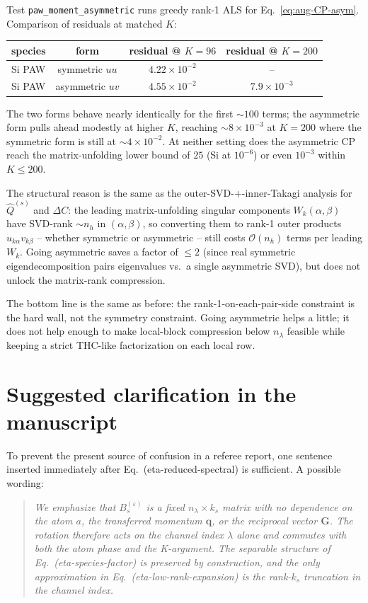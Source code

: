 \documentclass[aps,prb,reprint,superscriptaddress,nofootinbib]{revtex4-2}
\newcommand{\bG}{\mathbf G}
\newcommand{\bq}{\mathbf q}
\begin{document}
Test \texttt{paw\_moment\_asymmetric} runs greedy rank-1 ALS for
Eq.~\eqref{eq:aug-CP-asym}.  Comparison of residuals at matched \(K\):

\begin{table}[h]
\centering
\begin{tabular}{lccc}
\hline
species & form & residual @ \(K=96\) & residual @ \(K=200\) \\
\hline
Si PAW & symmetric \(uu\)        & \(4.22\times10^{-2}\) & --                   \\
Si PAW & asymmetric \(uv\)       & \(4.55\times10^{-2}\) & \(7.9\times 10^{-3}\) \\
\hline
\end{tabular}
\end{table}

The two forms behave nearly identically for the first \(\sim\!100\)
terms; the asymmetric form pulls ahead modestly at higher \(K\),
reaching \(\sim 8\times 10^{-3}\) at \(K=200\) where the symmetric
form is still at \(\sim 4\times 10^{-2}\).  At neither setting does
the asymmetric CP reach the matrix-unfolding lower bound of \(25\) (Si
at \(10^{-6}\)) or even \(10^{-3}\) within \(K\le 200\).

The structural reason is the same as the outer-SVD-+-inner-Takagi
analysis for \(\widehat Q^{(s)}\) and \(\Delta C\): the leading
matrix-unfolding singular components \(W_k(\alpha,\beta)\) have
SVD-rank \(\sim n_h\) in \((\alpha,\beta)\), so converting them to
rank-1 outer products \(u_{k\alpha}v_{k\beta}\) -- whether symmetric
or asymmetric -- still costs \(\mathcal O(n_h)\) terms per leading
\(W_k\).  Going asymmetric saves a factor of \(\le 2\) (since real
symmetric eigendecomposition pairs eigenvalues vs.\ a single
asymmetric SVD), but does not unlock the matrix-rank compression.

The bottom line is the same as before: the rank-1-on-each-pair-side
constraint is the hard wall, not the symmetry constraint.  Going
asymmetric helps a little; it does not help enough to make local-block
compression below \(n_\lambda\) feasible while keeping a strict
THC-like factorization on each local row.

\section{Suggested clarification in the manuscript}

To prevent the present source of confusion in a referee report, one
sentence inserted immediately after Eq.~(eta-reduced-spectral) is
sufficient.  A possible wording:
\begin{quote}
\itshape
We emphasize that \(B_s^{(\varepsilon)}\) is a fixed
\(n_\lambda\times k_s\) matrix with no dependence on the atom \(a\), the
transferred momentum \(\bq\), or the reciprocal vector \(\bG\).  The
rotation therefore acts on the channel index \(\lambda\) alone and
commutes with both the atom phase and the K-argument.  The separable
structure of Eq.~(eta-species-factor) is preserved by construction, and
the only approximation in Eq.~(eta-low-rank-expansion) is the rank-\(k_s\)
truncation in the channel index.
\end{quote}
\end{document}
